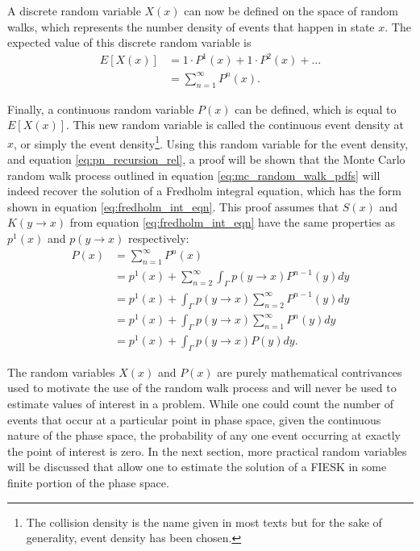 A discrete random variable $X(x)$ can now be defined on the space of random 
walks, which represents the number density of events that happen in state $x$. 
The expected value of this discrete random variable is
\begin{align}
  E[X(x)] & = 1 \cdot P^1(x) + 1 \cdot P^2(x) + \ldots \nonumber \\
  & = \sum_{n=1}^{\infty} P^n(x).
  \label{eq:expec_coll_dens}
\end{align}

Finally, a continuous random variable $P(x)$ can be defined, which is equal to
$E[X(x)]$. This new random variable is called the continuous event density 
at $x$, or simply the event density\footnote{The collision density is the name 
given in most texts but for the sake of generality, event density has been 
chosen.}. Using this random variable for the event density, and equation 
\ref{eq:pn_recursion_rel}, a proof will be shown that the Monte Carlo random 
walk process outlined in equation \ref{eq:mc_random_walk_pdfs} will indeed 
recover the solution of a Fredholm integral equation, which has the form shown 
in equation \ref{eq:fredholm_int_eqn}. This proof assumes that $S(x)$ and 
$K(y \to x)$ from equation \ref{eq:fredholm_int_eqn} have the same properties 
as $p^1(x)$ and $p(y \to x)$ respectively:
\begin{align}
  P(x) & = \sum_{n=1}^{\infty} P^n(x) \nonumber \\
  & = p^1(x) + \sum_{n=2}^{\infty} \int_{\Gamma} p(y \to x) P^{n-1}(y)dy \nonumber\\
  & = p^1(x) + \int_{\Gamma} p(y \to x) \sum_{n=2}^{\infty} P^{n-1}(y)dy \nonumber\\
  & = p^1(x) + \int_{\Gamma} p(y \to x) \sum_{n=1}^{\infty} P^{n}(y)dy \nonumber\\
  & = p^1(x) + \int_{\Gamma} p(y \to x) P(y)dy \nonumber.
\end{align}

The random variables $X(x)$ and $P(x)$ are purely mathematical contrivances
used to motivate the use of the random walk process and will never be used 
to estimate values of interest in a problem. While one could count the
number of events that occur at a particular point in phase space, given the 
continuous nature of the phase space, the probability of any one event 
occurring at exactly the point of interest is zero. In the next section, more 
practical random variables will be discussed that allow one to estimate 
the solution of a FIESK in some finite portion of the phase space.

